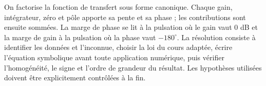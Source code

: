 \begin{corrigebox}[Corrigé]
On factorise la fonction de transfert sous forme canonique. Chaque gain, intégrateur, zéro et pôle apporte sa pente et sa phase ; les contributions sont ensuite sommées. La marge de phase se lit à la pulsation où le gain vaut $0$ dB et la marge de gain à la pulsation où la phase vaut $-180^\circ$.
La résolution consiste à identifier les données et l'inconnue, choisir la loi du cours adaptée, écrire l'équation symbolique avant toute application numérique, puis vérifier l'homogénéité, le signe et l'ordre de grandeur du résultat. Les hypothèses utilisées doivent être explicitement contrôlées à la fin.
\end{corrigebox}
